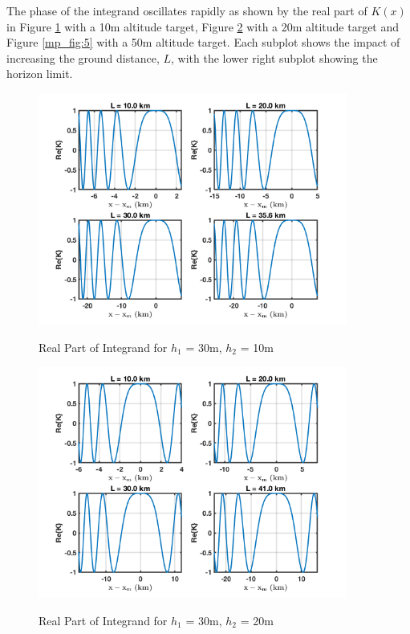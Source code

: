 The phase of the integrand oscillates rapidly as shown by the real part of $K(x)$ in Figure \ref{mp_fig:3} with a 10m altitude target, Figure \ref{mp_fig:4} with a 20m altitude target and Figure \ref{mp_fig:5} with a 50m altitude target. Each subplot shows the impact of increasing the ground distance, $L$, with the lower right subplot showing the horizon limit.

\begin{figure}[H]
  \begin{center}
\includegraphics[width=4in]{../media/analysis/phaseVariation_30_10}
  \end{center}
  \renewcommand{\baselinestretch}{1} \small\normalsize
  \begin{quote}
    \caption[Real Part of Integrand for $h_1$ = 30m, $h_2$ = 10m]{ Real Part of Integrand for $h_1$ = 30m, $h_2$ = 10m\label{mp_fig:3}}
  \end{quote}
\end{figure}
\renewcommand{\baselinestretch}{2} \small\normalsize

\begin{figure}[H]
  \begin{center}
\includegraphics[width=4in]{../media/analysis/phaseVariation_30_20}
  \end{center}
  \renewcommand{\baselinestretch}{1} \small\normalsize
  \begin{quote}
  \caption[Real Part of Integrand for $h_1$ = 30m, $h_2$ = 20m]{ Real Part of Integrand for $h_1$ = 30m, $h_2$ = 20m\label{mp_fig:4}}
  \end{quote}
\end{figure}
\renewcommand{\baselinestretch}{2} \small\normalsize

